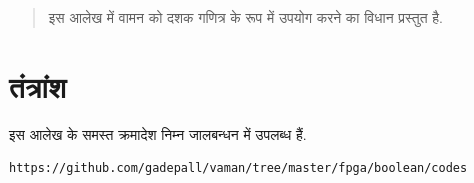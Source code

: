 \documentclass[journal,12pt,twocolumn]{IEEEtran}
\begin{document}



%

\begin{abstract}
इस आलेख में वामन को  दशक गणित्र के रूप में उपयोग करने का विधान प्रस्तुत है.


\end{abstract}

\printnomenclature[1.7in]

\section{तंत्रांश}
इस आलेख के समस्त क्रमादेश निम्न जालबन्धन में उपलब्ध हैं.
\begin{lstlisting}
https://github.com/gadepall/vaman/tree/master/fpga/boolean/codes
\end{lstlisting}
%
\end{document}
